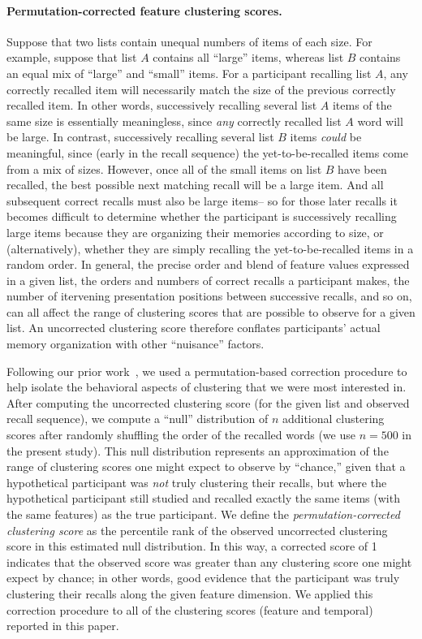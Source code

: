 \documentclass[11pt]{article}
\begin{document}
\paragraph*{Permutation-corrected feature clustering scores.}

Suppose that two lists contain unequal numbers of items of each size. For
example, suppose that list $A$ contains all ``large'' items, whereas list $B$
contains an equal mix of ``large'' and ``small'' items. For a participant
recalling list $A$, any correctly recalled item will necessarily match the size
of the previous correctly recalled item. In other words, successively recalling
several list $A$ items of the same size is essentially meaningless, since
\textit{any} correctly recalled list $A$ word will be large. In contrast,
successively recalling several list $B$ items \textit{could} be meaningful,
since (early in the recall sequence) the yet-to-be-recalled items come from a
mix of sizes. However, once all of the small items on list $B$ have been
recalled, the best possible next matching recall will be a large item. And all
subsequent correct recalls must also be large items-- so for those later
recalls it becomes difficult to determine whether the participant is
successively recalling large items because they are organizing their
memories according to size, or (alternatively), whether they are simply
recalling the yet-to-be-recalled items in a random order. In general, the
precise order and blend of feature values expressed in a given list, the orders
and numbers of correct recalls a participant makes, the number of itervening
presentation positions between successive recalls, and so on, can all affect
the range of clustering scores that are possible to observe for a given list.
An uncorrected clustering score therefore conflates participants' actual
memory organization with other ``nuisance'' factors.

Following our prior work~\citep{HeusEtal17}, we used a permutation-based
correction procedure to help isolate the behavioral aspects of clustering that
we were most interested in. After computing the uncorrected clustering score
(for the given list and observed recall sequence), we compute a ``null''
distribution of $n$ additional clustering scores after randomly shuffling the
order of the recalled words (we use $n = 500$ in the present study). This null
distribution represents an approximation of the range of clustering scores one
might expect to observe by ``chance,'' given that a hypothetical participant
was \textit{not} truly clustering their recalls, but where the hypothetical
participant still studied and recalled exactly the same items (with the same
features) as the true participant. We define the \textit{permutation-corrected
clustering score} as the percentile rank of the observed uncorrected clustering
score in this estimated null distribution. In this way, a corrected score of 1
indicates that the observed score was greater than any clustering score one
might expect by chance; in other words, good evidence that the participant was
truly clustering their recalls along the given feature dimension. We applied
this correction procedure to all of the clustering scores (feature and
temporal) reported in this paper.
\end{document}
